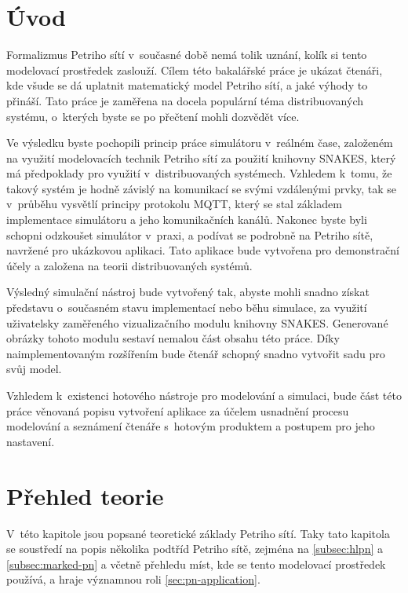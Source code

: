 \chapter{Úvod}
\label{chap:uvod}

Formalizmus Petriho sítí v~současné době nemá tolik uznání, kolík si tento modelovací prostředek zaslouží. Cílem této bakalářské práce je ukázat čtenáři, kde všude se dá uplatnit matematický model Petriho sítí, a jaké výhody to přináší. Tato práce je zaměřena na docela populární téma distribuovaných systému, o~kterých byste se po přečtení mohli dozvědět více.

Ve výsledku byste pochopili princip práce simulátoru v~reálném čase, založeném na využití modelovacích technik Petriho sítí za použití knihovny SNAKES, který má předpoklady pro využití v~distribuovaných systémech. Vzhledem k~tomu, že takový systém je hodně závislý na komunikací se svými vzdálenými prvky, tak se v~průběhu vysvětlí principy protokolu MQTT, který se stal základem implementace simulátoru a jeho komunikačních kanálů. Nakonec byste byli schopni odzkoušet simulátor v~praxi, a podívat se podrobně na Petriho sítě, navržené pro ukázkovou aplikaci. Tato aplikace bude vytvořena pro demonstrační účely a založena na teorii distribuovaných systémů.

Výsledný simulační nástroj bude vytvořený tak, abyste mohli snadno získat představu o~současném stavu implementací nebo běhu simulace, za využití uživatelsky zaměřeného vizualizačního modulu knihovny SNAKES. Generované obrázky tohoto modulu sestaví nemalou část obsahu této práce. Díky naimplementovaným rozšířením bude čtenář schopný snadno vytvořit sadu pro svůj model.

Vzhledem k~existenci hotového nástroje pro modelování a simulaci, bude část této práce věnovaná popisu vytvoření aplikace za účelem usnadnění procesu modelování a seznámení čtenáře s~hotovým produktem a postupem pro jeho nastavení.

\chapter{Přehled teorie}
\label{chapp:prehled}

V~této kapitole jsou popsané teoretické základy Petriho sítí. Taky tato kapitola se soustředí na popis několika podtříd Petriho sítě, zejména na  \ref{subsec:hlpn} a  \ref{subsec:marked-pn} a  včetně přehledu míst, kde se tento modelovací prostředek používá, a hraje významnou roli \ref{sec:pn-application}.

